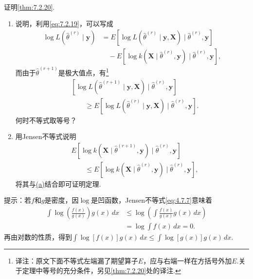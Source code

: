 \begin{exercise}\label{exercise:7.31}
证明\autoref{thm:7.2.20}.
\begin{enumerate}[label=(\alph*)]
\item{}\label{itm:exercise:7.31:a} 说明，利用\eqref{eq:7.2.19}，可以写成
\begin{align*}
\log L(\widehat\theta^{(r)}\mid\boldsymbol y)
&=E[\log L(\widehat\theta^{(r)}\mid\boldsymbol y,\boldsymbol X)\mid\widehat\theta^{(r)},\boldsymbol y]\\
&\quad-E[\log k(\boldsymbol X\mid\widehat\theta^{(r)},\boldsymbol y)\mid\widehat\theta^{(r)},\boldsymbol y],
\end{align*}
而由于$\widehat\theta^{(r+1)}$是极大值点，有\footnote{译注：原文下面不等式左端漏了期望算子$E$，应与右端一样在方括号外加$E$.关于定理中等号的充分条件，另见\autoref{thm:7.2.20}处的译注.}
\begin{align*}
&[\log L(\widehat\theta^{(r+1)}\mid\boldsymbol y,\boldsymbol X)\mid\widehat\theta^{(r)},\boldsymbol y]\\
&\qquad\ge E[\log L(\widehat\theta^{(r)}\mid\boldsymbol y,\boldsymbol X)\mid\widehat\theta^{(r)},\boldsymbol y].
\end{align*}
何时不等式取等号？
\item 用Jensen不等式说明
\begin{align*}
&E[\log k(\boldsymbol X\mid\widehat\theta^{(r+1)},\boldsymbol y)\mid\widehat\theta^{(r)},\boldsymbol y]\\
&\qquad\le E[\log k(\boldsymbol X\mid\widehat\theta^{(r)},\boldsymbol y)\mid\widehat\theta^{(r)},\boldsymbol y],
\end{align*}
将其与\hyperref[itm:exercise:7.31:a]{(a)}结合即可证明定理.
\end{enumerate}
提示：若$f$和$g$是密度，因$\log$是凹函数，Jensen不等式\eqref{eq:4.7.7}意味着
\begin{align*}
\int\log\left(\frac{f(x)}{g(x)}\right)g(x)\,dx
&\le\log\left(\int\frac{f(x)}{g(x)}g(x)\,dx\right)\\
&=\log\int f(x)\,dx=0.
\end{align*}
再由对数的性质，得到$\int\log[f(x)]g(x)\,dx\le\int\log[g(x)]g(x)\,dx$.
\end{exercise}
